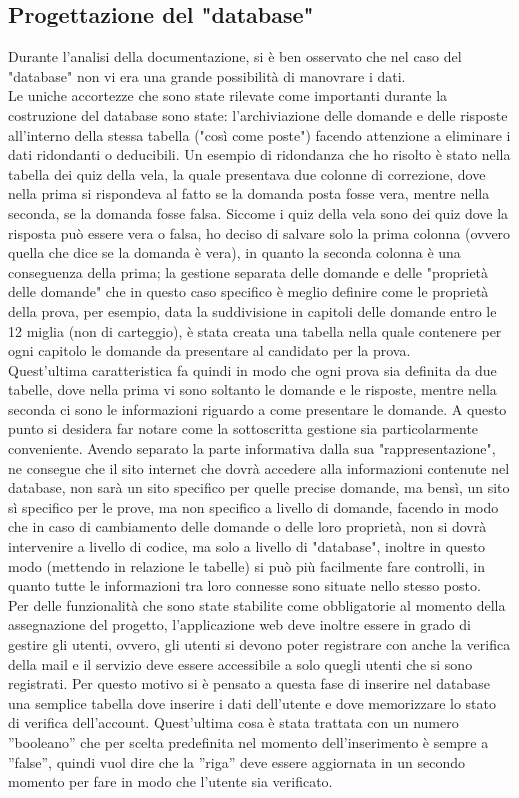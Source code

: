 \subsection{Progettazione del "database"}
Durante l'analisi della documentazione, si è ben osservato che nel caso del "database" non vi era una grande possibilità di manovrare i dati.\\
Le uniche accortezze che sono state rilevate come importanti durante la costruzione del database sono state: l'archiviazione delle domande e delle risposte all'interno della stessa tabella ("così come poste") facendo attenzione a eliminare i dati ridondanti o deducibili. Un esempio di ridondanza che ho risolto è stato nella tabella dei quiz della vela, la quale presentava due colonne di correzione, dove nella prima si rispondeva al fatto se la domanda posta fosse vera, mentre nella seconda, se la domanda fosse falsa. Siccome i quiz della vela sono dei quiz dove la risposta può essere vera o falsa, ho deciso di salvare solo la prima colonna (ovvero quella che dice se la domanda è vera), in quanto la seconda colonna è una conseguenza della prima; la gestione separata delle domande e delle "proprietà delle domande" che in questo caso specifico è meglio definire come le proprietà della prova, per esempio, data la suddivisione in capitoli delle domande entro le 12 miglia (non di carteggio), è stata creata una tabella nella quale contenere per ogni capitolo le domande da presentare al candidato per la prova.\\
Quest'ultima caratteristica fa quindi in modo che ogni prova sia definita da due tabelle, dove nella prima vi sono soltanto le domande e le risposte, mentre nella seconda ci sono le informazioni riguardo a come presentare le domande. A questo punto si desidera far notare come la sottoscritta gestione sia particolarmente conveniente. Avendo separato la parte informativa dalla sua "rappresentazione", ne consegue che il sito internet che dovrà accedere alla informazioni contenute nel database, non sarà un sito specifico per quelle precise domande, ma bensì, un sito sì specifico per le prove, ma non specifico a livello di domande, facendo in modo che in caso di cambiamento delle domande o delle loro proprietà, non si dovrà intervenire a livello di codice, ma solo a livello di "database", inoltre in questo modo (mettendo in relazione le tabelle) si può più facilmente fare controlli, in quanto tutte le informazioni tra loro connesse sono situate nello stesso posto.\\
Per delle funzionalità che sono state stabilite come obbligatorie al momento della assegnazione del progetto, l'applicazione web deve inoltre essere in grado di gestire gli utenti, ovvero, gli utenti si devono poter registrare con anche la verifica della mail e il servizio deve essere accessibile a solo quegli utenti che si sono registrati. Per questo motivo si è pensato a questa fase di inserire nel database una semplice tabella dove inserire i dati dell'utente e dove memorizzare lo stato di verifica dell'account. Quest'ultima cosa è stata trattata con un numero ”booleano” che per scelta predefinita nel momento dell'inserimento è sempre a ”false”, quindi vuol dire che la ”riga” deve essere aggiornata in un secondo momento per fare in modo che l’utente sia verificato.